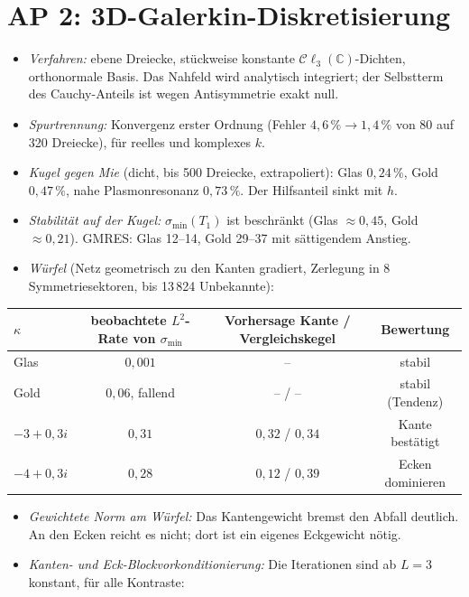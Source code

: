 \documentclass[11pt, a4paper]{article}
\newcommand{\clc}{\mathcal{C}\ell_{3}(\mathbb{C})}
\begin{document}
\section{AP 2: 3D-Galerkin-Diskretisierung}
\begin{itemize}[leftmargin=*]
  \item \emph{Verfahren:} ebene Dreiecke, stückweise konstante $\clc$-Dichten, orthonormale
    Basis. Das Nahfeld wird analytisch integriert; der Selbstterm des Cauchy-Anteils ist
    wegen Antisymmetrie exakt null.
  \item \emph{Spurtrennung:} Konvergenz erster Ordnung (Fehler $4{,}6\,\%\to1{,}4\,\%$ von 80 auf
    320 Dreiecke), für reelles und komplexes $k$.
  \item \emph{Kugel gegen Mie} (dicht, bis 500 Dreiecke, extrapoliert): Glas $0{,}24\,\%$, Gold
    $0{,}47\,\%$, nahe Plasmonresonanz $0{,}73\,\%$. Der Hilfsanteil sinkt mit $h$.
  \item \emph{Stabilität auf der Kugel:} $\sigma_{\min}(T_1)$ ist beschränkt (Glas $\approx0{,}45$,
    Gold $\approx0{,}21$). GMRES: Glas 12--14, Gold 29--37 mit sättigendem Anstieg.
  \item \emph{Würfel} (Netz geometrisch zu den Kanten gradiert, Zerlegung in 8
    Symmetriesektoren, bis 13\,824 Unbekannte):
\end{itemize}
\begin{center}\small
\begin{tabular}{lccc}
\toprule
$\kappa$ & beobachtete $L^2$-Rate von $\sigma_{\min}$ & Vorhersage Kante / Vergleichskegel & Bewertung\\
\midrule
Glas & $0{,}001$ & -- & stabil\\
Gold & $0{,}06$, fallend & -- / -- & stabil (Tendenz)\\
$-3+0{,}3i$ & $0{,}31$ & $0{,}32$ / $0{,}34$ & Kante bestätigt\\
$-4+0{,}3i$ & $0{,}28$ & $0{,}12$ / $0{,}39$ & Ecken dominieren\\
\bottomrule
\end{tabular}
\end{center}
\begin{itemize}[leftmargin=*]
  \item \emph{Gewichtete Norm am Würfel:} Das Kantengewicht bremst den Abfall deutlich. An
    den Ecken reicht es nicht; dort ist ein eigenes Eckgewicht nötig.
  \item \emph{Kanten- und Eck-Blockvorkonditionierung:} Die Iterationen sind ab $L=3$
    konstant, für alle Kontraste:
\end{itemize}
\end{document}
